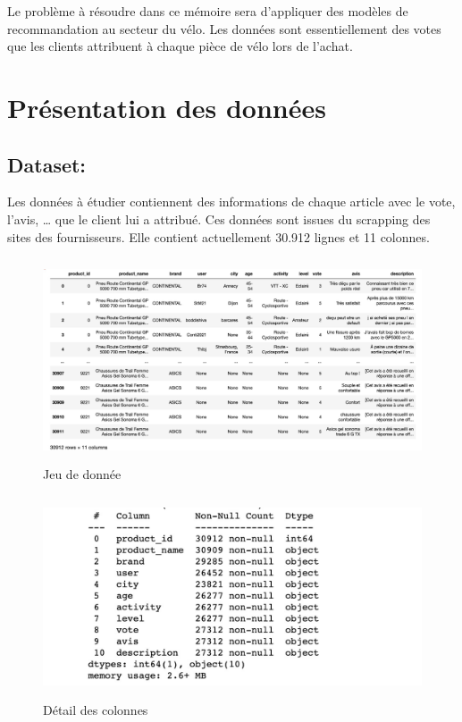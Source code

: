 Le problème à résoudre dans ce mémoire sera d’appliquer des modèles de recommandation au secteur du vélo. Les données sont essentiellement des votes que les clients attribuent à chaque pièce de vélo lors de l’achat.


\newpage
\section{Présentation des données}
\subsection{Dataset:}
Les données à étudier contiennent des informations de chaque article avec le vote, l’avis, … que le client lui a attribué. Ces données sont issues du scrapping des sites des fournisseurs. Elle contient actuellement 30.912 lignes et 11 colonnes.
\begin{figure}[h]
\begin{center}
\includegraphics[width=15cm,height=6cm]{images/sample_data.jpeg}
\caption[Jeu de donnée]{Jeu de donnée}
\label{monlabel}
\end{center}
\end{figure}

\begin{figure}[h]
\begin{center}
\includegraphics[width=15cm,height=6cm]{images/detail_columns.jpeg}
\caption[Détail des colonnes]{Détail des colonnes}
\label{monlabel}
\end{center}
\end{figure}

